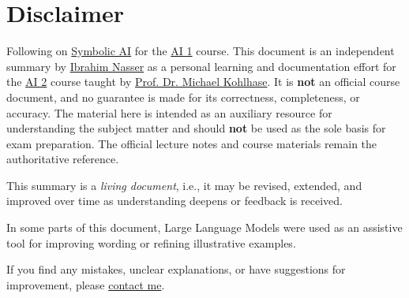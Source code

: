 \section*{Disclaimer}
Following on \href{https://github.com/96ibman/Symbolic-AI}{Symbolic AI} for the \href{https://alea.education/course-home/ai-1}{AI 1} course. This document is an independent summary by \href{https://96ibman.github.io/ibrahim-nasser/}{Ibrahim Nasser} as a personal learning and documentation effort for the \href{https://alea.education/course-home/ai-2}{AI 2} course taught by \href{https://kwarc.info/people/mkohlhase/}{Prof. Dr. Michael Kohlhase}. It is \textbf{not} an official course document, and no guarantee is made for its correctness, completeness, or accuracy. The material here is intended as an auxiliary resource for understanding the subject matter and should \textbf{not} be used as the sole basis for exam preparation. The official lecture notes and course materials remain the authoritative reference.

This summary is a \textit{living document}, i.e., it may be revised, extended, and improved over time as understanding deepens or feedback is received.

In some parts of this document, Large Language Models were used as an assistive tool for improving wording or refining illustrative examples.

If you find any mistakes, unclear explanations, or have suggestions for improvement, please \href{mailto:ibrahim.nasser@fau.de}{contact me}.
